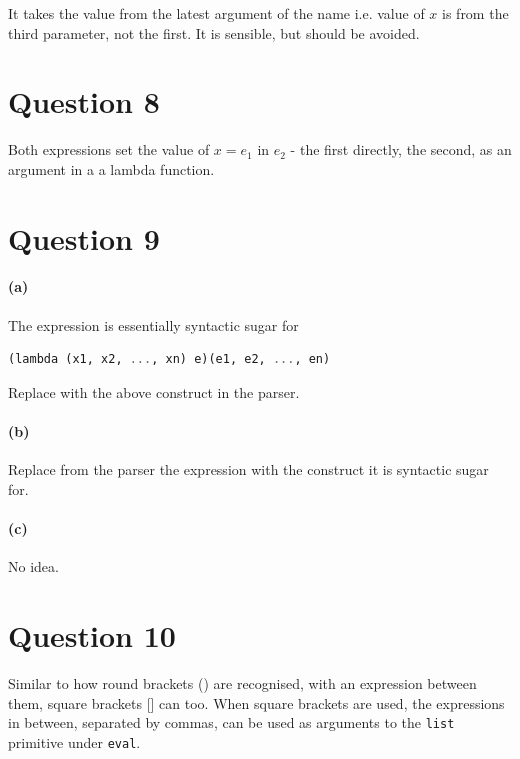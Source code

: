 \documentclass[11pt]{article} %
\begin{document}
It takes the value from the latest argument of the name
i.e. value of $x$ is from the third parameter, not the first.
It is sensible, but should be avoided.

\section*{Question 8}
Both expressions set the value of $x=e_1$ in $e_2$ - 
the first directly, the second, as an argument in a a lambda function.

\section*{Question 9}
\paragraph{(a)}
The expression is essentially syntactic sugar for
\begin{lstlisting}[language=Haskell]
(lambda (x1, x2, ..., xn) e)(e1, e2, ..., en)
\end{lstlisting}
Replace with the above construct in the parser.

\paragraph{(b)}
Replace from the parser the expression with the construct it is syntactic sugar for.
\paragraph{(c)}
No idea.

\section*{Question 10}
Similar to how round brackets () are recognised, with an expression between them,
square brackets [] can too.
When square brackets are used, the expressions in between, separated by commas,
can be used as arguments to the \texttt{list} primitive under \texttt{eval}.
\end{document}
